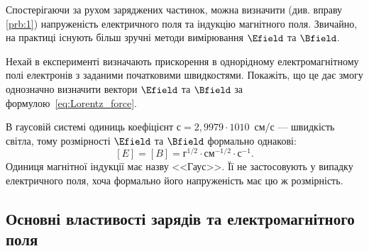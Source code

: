 Спостерігаючи за рухом заряджених частинок, можна визначити (див. вправу \ref{prb:1}) напруженість електричного поля та індукцію магнітного поля.
Звичайно, на практиці існують більш зручні методи вимірювання $\Efield$ та $\Bfield$.

\begin{problem}\label{prb:1}%
Нехай в експерименті визначають прискорення в однорідному
електромагнітному полі електронів з заданими початковими швидкостями.
Покажіть, що це дає змогу однозначно визначити вектори $\Efield$
та $\Bfield$ за формулою~\eqref{eq:Lorentz_force}.
\end{problem}

В гаусовій системі одиниць коефіцієнт $с = 2,9979⋅1010$~см/с --- швидкість
світла, тому розмірності $\Efield$
та $\Bfield$ формально однакові:
\begin{equation*}
	\left[ E\right]  = \left[ B \right]  = \text{г}^{1/2}\cdot\text{см}^{-1/2}\cdot\text{с}^{-1}.
\end{equation*}
Одиниця магнітної індукції має назву <<Гаус>>. Її не застосовують у випадку
електричного поля, хоча формально його напруженість має цю ж розмірність.


\subsection*{Основні властивості зарядів та електромагнітного поля}

